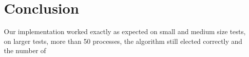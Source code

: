 \section*{Conclusion}

Our implementation worked exactly as expected on small and medium size tests, on larger tests, more than 50 processes, the algorithm still elected correctly and the number of 